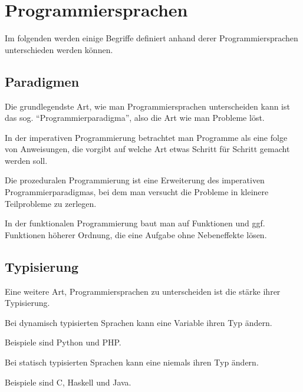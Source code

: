 \chapter{Programmiersprachen}
Im folgenden werden einige Begriffe definiert anhand derer
Programmiersprachen unterschieden werden können.

\section{Paradigmen}
Die grundlegendste Art, wie man Programmiersprachen unterscheiden
kann ist das sog. \enquote{Programmierparadigma}, also die Art wie
man Probleme löst.

\begin{definition}
    In der imperativen Programmierung betrachtet man Programme als
    eine folge von Anweisungen, die vorgibt auf welche Art etwas 
    Schritt für Schritt gemacht werden soll.
\end{definition}

\begin{definition}
    Die prozeduralen Programmierung ist eine Erweiterung des imperativen
    Programmierparadigmas, bei dem man versucht die Probleme in 
    kleinere Teilprobleme zu zerlegen.
\end{definition}

\begin{definition}
    In der funktionalen Programmierung baut man auf Funktionen und
    ggf. Funktionen höherer Ordnung, die eine Aufgabe ohne Nebeneffekte
    lösen.
\end{definition}

\section{Typisierung}
Eine weitere Art, Programmiersprachen zu unterscheiden ist die stärke
ihrer Typisierung.

\begin{definition}
    Bei dynamisch typisierten Sprachen kann eine Variable ihren Typ ändern.
\end{definition}

Beispiele sind Python und PHP.

\begin{definition}
    Bei statisch typisierten Sprachen kann eine niemals ihren Typ ändern.
\end{definition}

Beispiele sind C, Haskell und Java.
